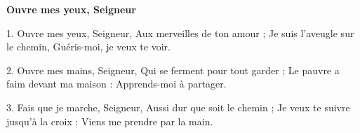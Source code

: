 \textbf{Ouvre mes yeux, Seigneur}

1.
Ouvre mes yeux, Seigneur,
Aux merveilles de ton amour ;
Je suis l’aveugle sur le chemin,
Guéris-moi, je veux te voir.

2.
Ouvre mes mains, Seigneur,
Qui se ferment pour tout garder ;
Le pauvre a faim devant ma maison :
Apprends-moi à partager.

3.
Fais que je marche, Seigneur,
Aussi dur que soit le chemin ;
Je veux te suivre jusqu’à la croix :
Viens me prendre par la main.
%
%
